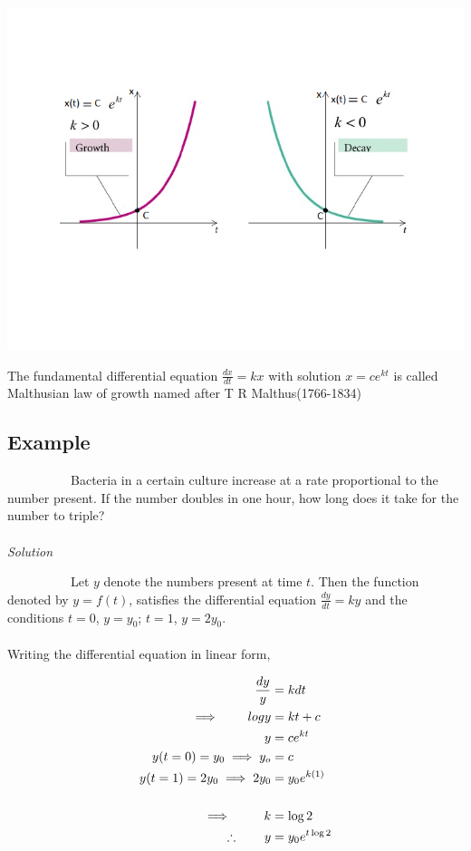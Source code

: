 \begin{center}
	\scalebox{1.00} %
	{\includegraphics{graph3.png}}
\end{center}

The fundamental differential equation $\frac{dx}{dt}=kx$ with solution $x=ce^{kt}$ is called Malthusian law of growth named after T R Malthus(1766-1834)


\subsection*{Example} 

\par ~~~~~~~~~~Bacteria in a certain culture increase at a rate proportional to the number present. If the number doubles in one hour, how long does it take for the number to triple?\\                
\\
\textit{\Large Solution}

\par ~~~~~~~~~~Let $y$ denote the numbers present at time $t$. Then the function denoted by $y = f(t)$, satisfies the differential equation $ \frac{dy}{dt}=ky $ and the conditions $t = 0$, $y = y_{0}$; $t = 1$, $y = 2y_{0}$. 
\\
\\
Writing the differential equation in linear form, \\
\begin{center}
	\begin{eqnarray*}
		 		\frac{dy}{y}&=kdt \\
		 		\implies ~~~~~~	  logy&=kt+c \\ 
		  		y&=ce^{kt} \\
		 		y(t=0)=y_{0}  \implies     y_{o}&=c \\
 		 		y(t=1)=2y_{0} 	\implies 2y_{0}&=y_{0}e^{k(1)} \\
 		 		\\
 		 		\linebreak
 				\implies~~~~~~~ 	k&=\log2 \\
 				\therefore ~~~~~~	y&=y_{0}e^{t\log2} \\
	\end{eqnarray*}
\end{center} 


